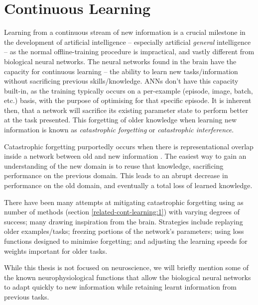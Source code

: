 \documentclass{report}
\begin{document}
\section{Continuous Learning}
Learning from a continuous stream of new information is a crucial milestone in the development of artificial intelligence -- especially artificial \emph{general} intelligence -- as the normal offline-training procedure is impractical, and vastly different from biological neural networks. The neural networks found in the brain have the capacity for continuous learning -- the ability to learn new tasks/information without sacrificing previous skills/knowledge. ANNs don't have this capacity built-in, as the training typically occurs on a per-example (episode, image, batch, etc.) basis, with the purpose of optimising for that specific episode. It is inherent then, that a network will sacrifice its existing parameter state to perform better at the task presented. This forgetting of older knowledge when learning new information is known as \textit{catastrophic forgetting} or \textit{catastrophic interference}. \par
Catastrophic forgetting purportedly occurs when there is representational overlap inside a network between old and new information \parencite{hat}. The easiest way to gain an understanding of the new domain is to reuse that knowledge, sacrificing performance on the previous domain. This leads to an abrupt decrease in performance on the old domain, and eventually a total loss of learned knowledge. \par
There have been many attempts at mitigating catastrophic forgetting using as number of methods (section \ref{related-cont-learning:1}) with varying degrees of success; many drawing inspiration from the brain. Strategies include replaying older examples/tasks; freezing portions of the network's parameters; using loss functions designed to minimise forgetting; and adjusting the learning speeds for weights important for older tasks. \par
While this thesis is not focused on neuroscience, we will briefly mention some of the known neurophysiological functions that allow the biological neural networks to adapt quickly to new information while retaining learnt information from previous tasks. \par
\end{document}
